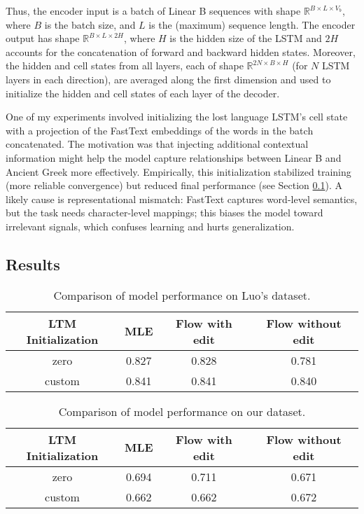 Thus, the encoder input is a batch of Linear B sequences with shape $\mathbb{R}^{B\times L\times V_b}$, where $B$ is the batch size, and $L$ is the (maximum) sequence length.
The encoder output has shape $\mathbb{R}^{B\times L\times 2H}$, where $H$ is the hidden size of the LSTM and $2H$ accounts for the concatenation of forward and backward hidden states.
Moreover, the hidden and cell states from all layers, each of shape $\mathbb{R}^{2N\times B\times H}$ (for $N$ LSTM layers in each direction), are averaged along the first dimension and used to initialize the hidden and cell states of each layer of the decoder.

One of my experiments involved initializing the lost language LSTM's cell state with a projection of the FastText embeddings of the words in the batch concatenated.
The motivation was that injecting additional contextual information might help the model capture relationships between Linear B and Ancient Greek more effectively.
Empirically, this initialization stabilized training (more reliable convergence) but reduced final performance (see Section \ref{sec:results}).
A likely cause is representational mismatch: FastText captures word-level semantics, but the task needs character-level mappings; this biases the model toward irrelevant signals, which confuses learning and hurts generalization.


\newpage

\subsection{Results} \label{sec:results}
\begin{table}[h!]
\centering
\begin{tabular}{|c|c|c|c|}
\hline
\textbf{LTM Initialization} & \textbf{MLE} & \textbf{Flow with edit} & \textbf{Flow without edit} \\
\hline
zero & 0.827 & 0.828 & 0.781 \\
custom & 0.841 & 0.841 & 0.840 \\
\hline
\end{tabular}
\caption{Comparison of model performance on Luo's dataset.}
\end{table}

\begin{table}[h!]
\centering
\begin{tabular}{|c|c|c|c|}
\hline
\textbf{LTM Initialization} & \textbf{MLE} & \textbf{Flow with edit} & \textbf{Flow without edit} \\
\hline
zero & 0.694 & 0.711 & 0.671 \\
custom & 0.662 & 0.662 & 0.672 \\
\hline
\end{tabular}
\caption{Comparison of model performance on our dataset.}
\end{table}

